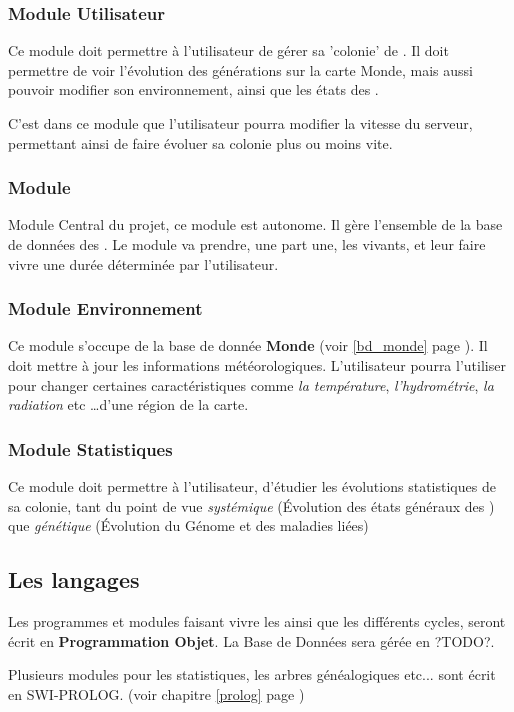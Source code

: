 \documentclass[french]{report}
\begin{document}
\subsubsection{Module Utilisateur}
Ce module doit permettre à l'utilisateur de gérer sa 'colonie' de \CoCiX. Il doit permettre de voir l'évolution des générations sur la carte Monde, mais aussi pouvoir modifier son environnement, ainsi que les états des \CoCiX.

C'est dans ce module que l'utilisateur pourra modifier la vitesse du serveur, permettant ainsi de faire évoluer sa colonie plus ou moins vite.

\subsubsection{Module \CoCiX}
Module Central du projet, ce module est autonome. Il gère l'ensemble de la base de données des \CoCiX. Le module va prendre, une part une, les \CoCiX vivants, et leur faire vivre une durée déterminée par l'utilisateur.
\subsubsection{Module Environnement}
Ce module s'occupe de la base de donnée \textbf{Monde} (voir \ref{bd_monde} page \pageref{bd_monde}). Il doit mettre à jour les informations météorologiques. L'utilisateur pourra l'utiliser pour changer certaines caractéristiques comme \textit{la température}, \textit{l'hydrométrie}, \textit{la radiation} etc \dots d'une région de la carte.

\subsubsection{Module Statistiques}
Ce module doit permettre à l'utilisateur, d'étudier les évolutions statistiques de sa colonie, tant du point de vue \emph{systémique} (Évolution des états généraux des \CoCiX) que \emph{génétique} (Évolution du Génome et des maladies liées)

\subsection{Les langages}
Les programmes et modules faisant vivre les \CoCiX ainsi que les différents cycles, seront écrit en \textbf{Programmation Objet}. La Base de Données sera gérée en ?TODO?.

Plusieurs modules pour les statistiques, les arbres généalogiques etc... sont écrit en SWI-PROLOG. (voir chapitre \ref{prolog} page \pageref{prolog})
\end{document}
